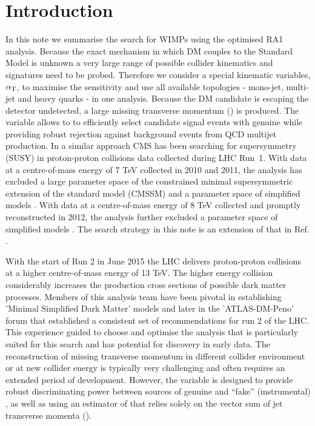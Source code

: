 \section{Introduction}
\label{sec:intro}

In this note we summarise the search for WIMPs using the optimised RA1 analysis.
Because the exact mechanism in which DM couples to the Standard Model is unknown a very large range of possible collider kinematics 
and signatures need to be probed. Therefore we consider a special kinematic variables,  $\alpha_{\textrm T}$, to maximise
 the sensitivity and use all available topologies - mono-jet, multi-jet and heavy quarks - in one analysis. 
Because the DM candidate is escaping the detector undetected, a large missing transverse momentum (\MET) is produced.
The \alphat variable allows to to efficiently select candidate signal events with genuine \MET while
providing robust rejection against background events from QCD multijet production. 
In a similar approach CMS has been searching for supersymmetry (SUSY) in proton-proton collisions data collected during LHC Run~1. With data at a centre-of-mass energy of 7 TeV collected in
2010 and 2011, the \alphat analysis has excluded a large parameter space of the constrained minimal supersymmetric extension of the
standard model (CMSSM) \cite{Khachatryan:2011tk, Chatrchyan:2011zy, Chatrchyan:2012wa} and a parameter space of simplified models
\cite{Chatrchyan:2012wa}. With data at a centre-of-mass energy of 8 TeV collected and promptly reconstructed in 2012, the \alphat analysis
further excluded a parameter space of simplified models \cite{Chatrchyan:2013lya}. 
The search strategy in this note is an extension of that in Ref. \cite{CMS_AN_2013-366}.

With the start of Run 2 in June 2015 the LHC delivers proton-proton collisions at a higher centre-of-mass
energy of 13 TeV. The higher energy collision considerably increases the production cross sections of possible dark matter processes.
Members of this analysis team have been pivotal in establishing 'Minimal Simplified Dark Matter' models and later in the 'ATLAS-DM-Peno' forum that established a consistent set of recommendations for run 2 of the LHC. This experience guided to choose and optimise the \alphat analysis that is particularly suited for this search and has potential for
discovery in early data. The reconstruction of missing transverse momentum in different collider 
environment or at new collider energy is typically very challenging and often requires an extended period of
development. However, the \alphat variable is designed to provide robust discriminating power between sources of genuine and ``fake''
(\eg instrumental) \met, as well as using an estimator of \met that
relies solely on the vector sum of jet transverse momenta (\mht).

